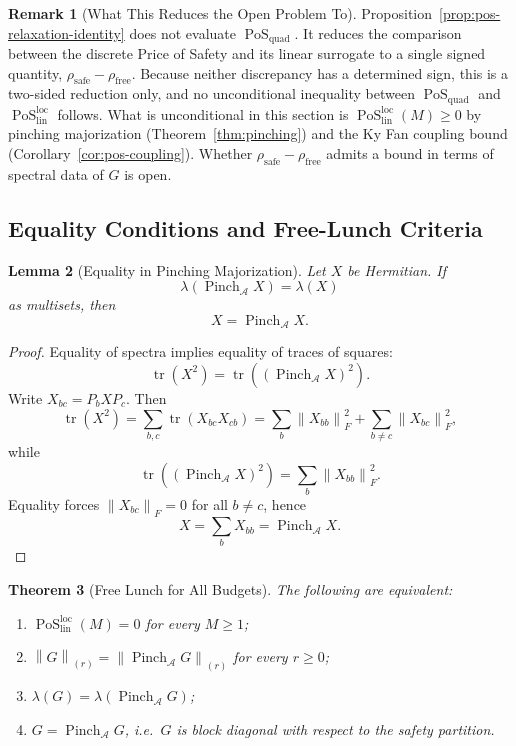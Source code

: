 \documentclass[12pt]{article}
\newtheorem{theorem}{Theorem}[section]
\newtheorem{lemma}[theorem]{Lemma}
\theoremstyle{definition}
\newtheorem{remark}[theorem]{Remark}
\DeclareMathOperator{\tr}{tr}
\DeclareMathOperator{\PoS}{PoS}
\newcommand{\norm}[1]{\left\lVert#1\right\rVert}
\newcommand{\EA}{\operatorname{Pinch}_{\mathcal A}}
\newcommand{\KyF}[2]{\left\|#1\right\|_{(#2)}}
\newcommand{\PoSlin}{\PoS_{\mathrm{lin}}^{\mathrm{loc}}}
\newcommand{\PoSquad}{\PoS_{\mathrm{quad}}}
\begin{document}
\begin{remark}[What This Reduces the Open Problem To]
\label{rem:pos-reduction}
Proposition~\ref{prop:pos-relaxation-identity} does not evaluate $\PoSquad$.
It reduces the comparison between the discrete Price of Safety and its linear
surrogate to a single signed quantity,
$\rho_{\mathrm{safe}}-\rho_{\mathrm{free}}$.  Because neither discrepancy has a
determined sign, this is a two-sided reduction only, and no unconditional
inequality between $\PoSquad$ and $\PoSlin$ follows.  What is unconditional in
this section is $\PoSlin(M)\ge0$ by pinching majorization
(Theorem~\ref{thm:pinching}) and the Ky Fan coupling bound
(Corollary~\ref{cor:pos-coupling}).  Whether
$\rho_{\mathrm{safe}}-\rho_{\mathrm{free}}$ admits a bound in terms of spectral
data of $G$ is open.
\end{remark}

\subsection{Equality Conditions and Free-Lunch Criteria}
\label{subsec:pos-equality}

\begin{lemma}[Equality in Pinching Majorization]
\label{lem:equality-pinching}
Let $X$ be Hermitian.  If
\[
\lambda(\EA X)=\lambda(X)
\]
as multisets, then
\[
X=\EA X.
\]
\end{lemma}

\begin{proof}
Equality of spectra implies equality of traces of squares:
\[
\tr(X^2)=\tr((\EA X)^2).
\]
Write $X_{bc}=P_bXP_c$.  Then
\[
\tr(X^2)
=
\sum_{b,c}\tr(X_{bc}X_{cb})
=
\sum_b
\norm{X_{bb}}_F^2
+
\sum_{b\neq c}
\norm{X_{bc}}_F^2,
\]
while
\[
\tr((\EA X)^2)
=
\sum_b
\norm{X_{bb}}_F^2.
\]
Equality forces $\norm{X_{bc}}_F=0$ for all $b\neq c$, hence
\[
X=\sum_bX_{bb}=\EA X.
\]
\end{proof}

\begin{theorem}[Free Lunch for All Budgets]
\label{thm:pos-allM}
The following are equivalent:
\begin{enumerate}[label=(\roman*)]
\item $\PoSlin(M)=0$ for every $M\ge1$;
\item $\KyF{G}{r}=\KyF{\EA G}{r}$ for every $r\ge0$;
\item $\lambda(G)=\lambda(\EA G)$;
\item $G=\EA G$, i.e.\ $G$ is block diagonal with respect to the safety
partition.
\end{enumerate}
\end{theorem}
\end{document}
